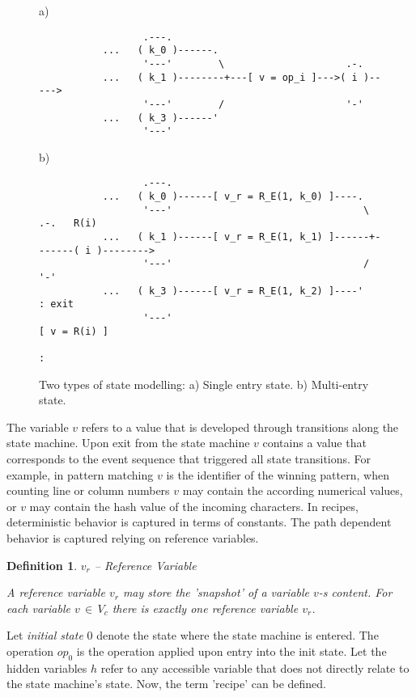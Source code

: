 \documentclass[12pt,a4paper]{scrartcl}
\newtheorem{definition}{Definition}
\begin{document}
\begin{figure}[htbp] \leavevmode \label{fig:se-vs-me}
a)

\begin{verbatim}
                  .---.  
           ...   ( k_0 )------.
                  '---'        \                     .-.
           ...   ( k_1 )--------+---[ v = op_i ]--->( i )----->   
                  '---'        /                     '-'
           ...   ( k_3 )------'       
                  '---'
\end{verbatim}
     
b)
     
\begin{verbatim}
                  .---.
           ...   ( k_0 )------[ v_r = R_E(1, k_0) ]----.
                  '---'                                 \         .-.   R(i)
           ...   ( k_1 )------[ v_r = R_E(1, k_1) ]------+-------( i )-------->  
                  '---'                                 /         '-'
           ...   ( k_3 )------[ v_r = R_E(1, k_2) ]----'           : exit
                  '---'                                       [ v = R(i) ]
                                                                   :
\end{verbatim}
\caption{Two types of state modelling: a) Single entry state. 
b) Multi-entry state.}
\end{figure}

The variable $v$ refers to a value that is developed through transitions along
the state machine. Upon exit from the state machine $v$ contains a value that
corresponds to the event sequence that triggered all state transitions. For
example, in pattern matching $v$ is the identifier of the winning pattern, when
counting line or column numbers $v$ may contain the according numerical values,
or $v$ may contain the hash value of the incoming characters. In recipes,
deterministic behavior is captured in terms of constants. The path dependent
behavior is captured relying on reference variables.

\begin{definition} $v_r$ -- Reference Variable

    A reference variable $v_r$ may store the 'snapshot' of a variable $v$-s
    content. For each variable $v\,\in\,V_c$ there is exactly one reference
    variable $v_r$.

\end{definition}

Let \textit{initial state} 0 denote the state where the state machine is entered.
The operation $op_0$ is the operation applied upon entry into the init state.
Let the hidden variables $h$ refer to any accessible variable that does not
directly relate to the state machine's state. Now, the term 'recipe' can 
be defined.
\end{document}
